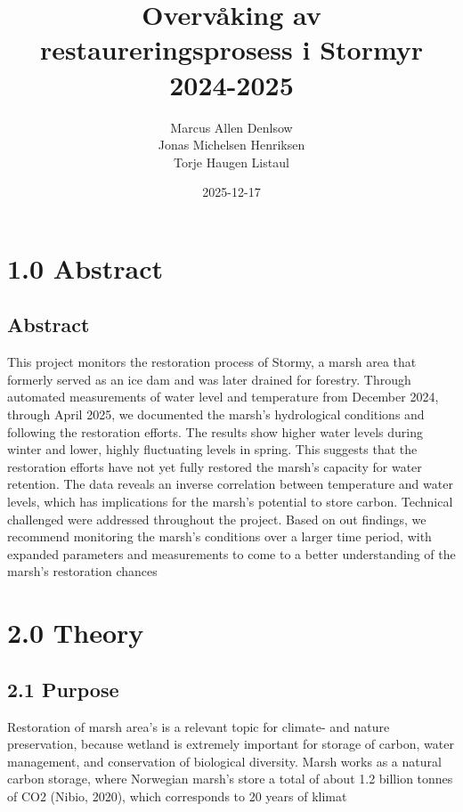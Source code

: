 \documentclass{report}
\title{\Huge Overvåking av\\ restaureringsprosess i Stormyr\\ 2024-2025}
\author{\Huge Marcus Allen Denlsow\\ Jonas Michelsen Henriksen\\ Torje Haugen Listaul}
\date{2025-12-17}
\begin{document}
\maketitle
\newpage%
\tableofcontents
\pagebreak

\chapter{1.0 Abstract}
\section{Abstract}
This project monitors the restoration process of Stormy, a marsh area that formerly served as an ice dam and was later drained for forestry. Through automated measurements of water level and temperature from December 2024, through April 2025, we documented the marsh's hydrological conditions and following the restoration efforts. The results show higher water levels during winter and lower, highly fluctuating levels in spring. This suggests that the restoration efforts have not yet fully restored the marsh's capacity for water retention. The data reveals an inverse correlation between temperature and water levels, which has implications for the marsh's potential to store carbon. Technical challenged were addressed throughout the project. Based on out findings, we recommend monitoring the marsh's conditions over a larger time period, with expanded parameters and measurements to come to a better understanding of the marsh's restoration chances


\chapter{2.0 Theory}
\section{2.1 Purpose}
Restoration of marsh area's is a relevant topic for climate- and nature preservation, because wetland is extremely important for storage of carbon, water management, and conservation of biological diversity. Marsh works as a natural carbon storage, where Norwegian marsh's store a total of about 1.2 billion tonnes of CO2 (Nibio, 2020), which corresponds to 20 years of klimat
\end{document}
